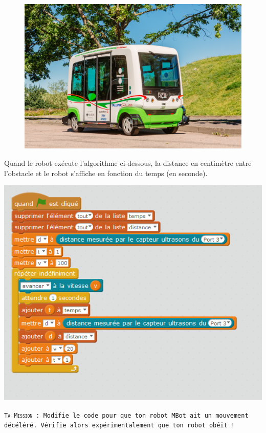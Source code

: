 \begin{figure}
    \includegraphics[width=\linewidth]{res/mbot_autonome.jpg}
\end{figure}

\begin{eleve}
    
    Quand le robot exécute l'algorithme ci-dessous, la distance en centimètre entre l'obstacle et le robot s'affiche en fonction du temps (en seconde).
    
    \begin{center}
            \includegraphics[width=0.75\linewidth]{res/mbot-nature01.png}
    \end{center}
    
    \texttt{\textsc{Ta Mission} : Modifie le code pour que ton robot MBot ait un mouvement décéléré. Vérifie alors expérimentalement que ton robot obéit !}
\end{eleve}


